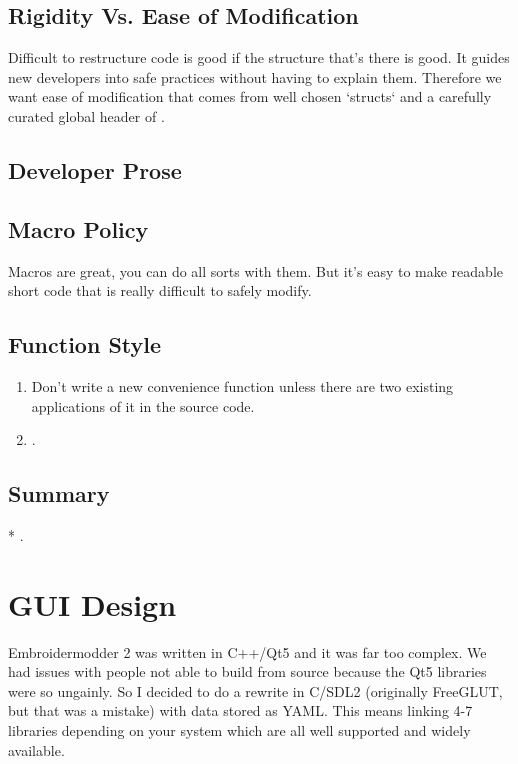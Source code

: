 \documentclass[a4paper]{report}
\begin{document}
\subsection{Rigidity Vs. Ease of Modification}

Difficult to restructure code is good if the structure that's there is good.
It guides new developers into safe practices without having to explain them.
Therefore we want ease of modification that comes from well chosen `structs`
and a carefully curated global header of .

\subsection{Developer Prose}

\subsection{Macro Policy}

Macros are great, you can do all sorts with them. But it's easy to make readable
short code that is really difficult to safely modify.

\subsection{Function Style}

\begin{enumerate}
\item Don't write a new convenience function unless there are two
existing applications of it in the source code.
\item .
\end{enumerate}

\subsection{Summary}

* .

\section{GUI Design}

Embroidermodder 2 was written in C++/Qt5 and it was far too complex. We had
issues with people not able to build from source because the Qt5 libraries were
so ungainly. So I decided to do a rewrite in C/SDL2 (originally FreeGLUT, but
that was a mistake) with data stored as YAML. This means linking 4-7 libraries
depending on your system which are all well supported and widely available.
\end{document}
